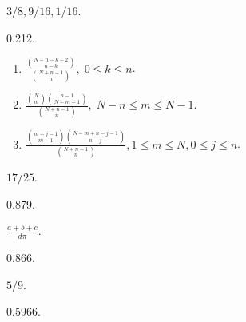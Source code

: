 \begin{answer}
  \item $3/8,9/16,1/16$.

  \item 0.212.

  \item \begin{enumerate}
    \item $\frac{\binom{N+n-k-2}{n-k}}{\binom{N+n-1}n},\;0\le k\le n$.
    \item $\frac{\binom Nm\binom{n-1}{N-m-1}}{\binom{N+n-1}n},\;N-n\le m\le N-1$.
    \item $\frac{\binom{m+j-1}{m-1}\binom{N-m+n-j-1}{n-j}}
    {\binom{N+n-1}n},1\le m\le N,0\le j\le n$.
  \end{enumerate}

  \item $17/25$.
  \item 0.879.
  \item $\frac{a+b+c}{d\pi}$.
  \item 0.866.
  \item $5/9$.
  \item 0.5966.
\end{answer}


